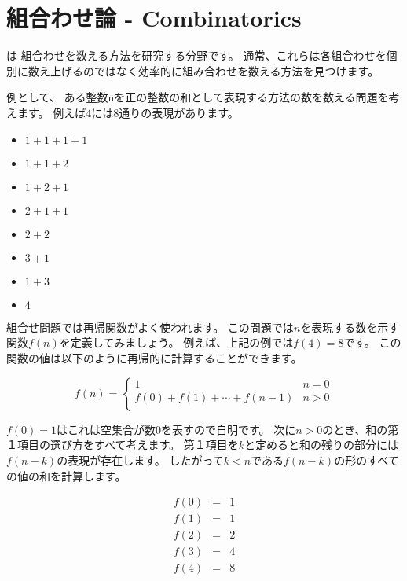 \chapter{組合わせ論 - Combinatorics}


 は
組合わせを数える方法を研究する分野です。
通常、これらは各組合わせを個別に数え上げるのではなく効率的に組み合わせを数える方法を見つけます。

例として、
ある整数nを正の整数の和として表現する方法の数を数える問題を考えます。
例えば$4$には8通りの表現があります。

\begin{multicols}{2}
\begin{itemize}
\item $1+1+1+1$
\item $1+1+2$
\item $1+2+1$
\item $2+1+1$
\item $2+2$
\item $3+1$
\item $1+3$
\item $4$
\end{itemize}
\end{multicols}

組合せ問題では再帰関数がよく使われます。
この問題では$n$を表現する数を示す
関数$f(n)$を定義してみましょう。
例えば、上記の例では$f(4)=8$です。
この関数の値は以下のように再帰的に計算することができます。

\begin{equation*}
    f(n) = \begin{cases}
               1               & n = 0\\
               f(0)+f(1)+\cdots+f(n-1) & n > 0\\
           \end{cases}
\end{equation*}

$f(0)=1$はこれは空集合が数0を表すので自明です。
次に$n > 0$のとき、和の第１項目の選び方をすべて考えます。
第１項目を$k$と定めると和の残りの部分には$f (n - k)$の表現が存在します。
したがって$k < n$である$f (n - k)$の形のすべての値の和を計算します。

\[
\begin{array}{lcl}
f(0) & = & 1 \\
f(1) & = & 1 \\
f(2) & = & 2 \\
f(3) & = & 4 \\
f(4) & = & 8 \\
\end{array}
\]

